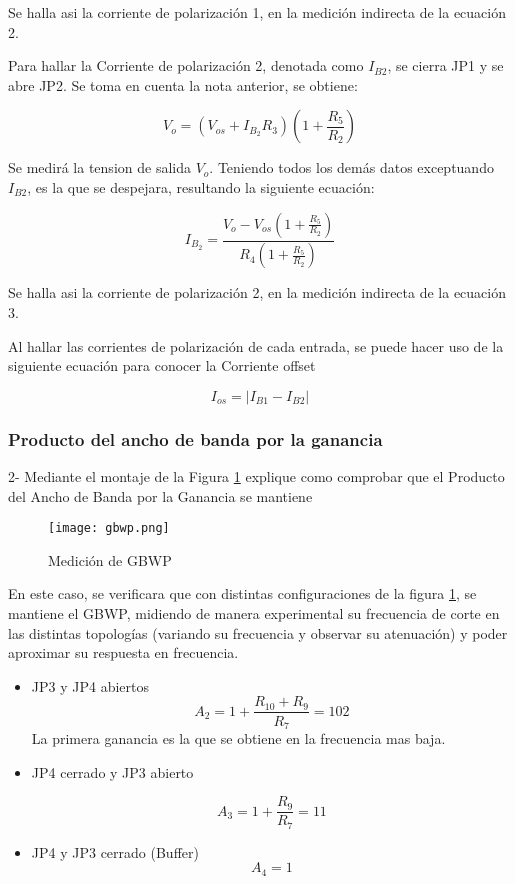  Se halla asi la corriente de polarización 1, en la medición indirecta de la ecuación 2.

Para hallar la Corriente de polarización 2, denotada como $I_{B2}$, se cierra JP1 y se
abre JP2. Se toma en cuenta la nota anterior, se obtiene:

\begin{equation}
    V_o = \left( V_{os} + I_{B_2} R_3 \right) \left( 1 + \frac{R_5}{R_2} \right)
\end{equation}

Se medirá la tension de salida $V_o$. Teniendo todos los demás datos exceptuando $I_{B2}$, es la que se despejara, resultando la siguiente ecuación:

\begin{equation}
    I_{B_2} = \frac{V_o - V_{os} \left( 1 + \frac{R_5}{R_2} \right)}{R_4 \left( 1 + \frac{R_5}{R_2} \right)}
\end{equation}

Se halla asi la corriente de polarización 2, en la medición indirecta de la ecuación 3.

Al hallar las corrientes de polarización de cada entrada, se puede hacer uso de la siguiente ecuación para conocer la Corriente offset

\begin{equation}
    I_{os} = \left| I_{B1} - I_{B2} \right|
\end{equation}

\subsubsection{Producto del ancho de banda por la ganancia}

2- Mediante el montaje de la Figura \ref{fig:gbwp} explique como comprobar que el Producto del Ancho de Banda por la Ganancia
se mantiene

\begin{figure}[ht]
    \centering
    \texttt{[image: gbwp.png]}
    \caption{Medición de GBWP}
    \label{fig:gbwp}
\end{figure}

En este caso, se verificara que con distintas configuraciones de la figura \ref{fig:gbwp}, se mantiene el GBWP, midiendo de manera experimental su frecuencia de corte en las distintas topologías
(variando su frecuencia y observar su atenuación) y poder aproximar su respuesta en frecuencia.

\begin{itemize}
    \item JP3 y JP4 abiertos
    $$A_2 = 1 + \frac{R_{10} + R_9}{R_7} = 102$$
    La primera ganancia es la que se obtiene en la frecuencia mas baja.
    \item JP4 cerrado y JP3 abierto

    $$A_3 = 1 + \frac{R_9}{R_7} = 11$$

    \item JP4 y JP3 cerrado (Buffer)
    $$A_4=1$$

\end{itemize}

